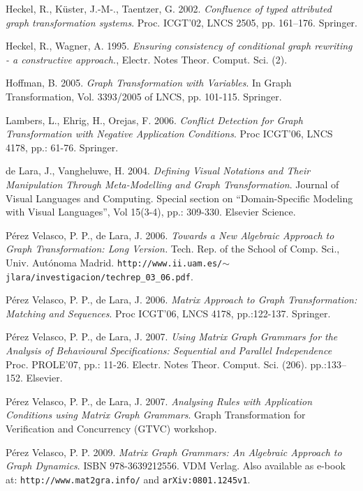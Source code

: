 \documentclass{fundam}
\begin{document}
\begin{thebibliography}{10}
 Heckel, R., K\"uster, J.-M-., Taentzer, G. 2002.
  {\em Confluence of typed attributed graph transformation systems}.
  Proc. ICGT'02, LNCS 2505, pp. 161--176. Springer.

 Heckel, R., Wagner, A. 1995.  {\em Ensuring
    consistency of conditional graph rewriting - a constructive
    approach.}, Electr. Notes Theor. Comput. Sci. (2).

 Hoffman, B. 2005.  \emph{Graph Transformation with
    Variables}.  In Graph Transformation, Vol. 3393/2005 of LNCS, pp.
  101-115. Springer.

 Lambers, L., Ehrig, H., Orejas, F. 2006.  {\em
    Conflict Detection for Graph Transformation with Negative
    Application Conditions}.  Proc ICGT'06, LNCS 4178, pp.: 61-76.
  Springer.

 de Lara, J., Vangheluwe, H. 2004.  {\em Defining Visual
    Notations and Their Manipulation Through Meta-Modelling and Graph
    Transformation}.  Journal of Visual Languages and Computing.
  Special section on ``Domain-Specific Modeling with Visual
  Languages'', Vol 15(3-4), pp.: 309-330. Elsevier Science.

 P\'erez Velasco, P. P., de Lara, J. 2006.
  \emph{Towards a New Algebraic Approach to Graph Transformation: Long
    Version.}  Tech. Rep. of the School of Comp. Sci., Univ.
  Aut\'onoma Madrid.
  {\texttt{http://www.ii.uam.es/$\sim$jlara/investigacion/techrep\_03\_06.pdf}}.

 P\'erez Velasco, P. P., de Lara, J. 2006.  {\em
    Matrix Approach to Graph Transformation: Matching and Sequences}.
  Proc ICGT'06, LNCS 4178, pp.:122-137. Springer.

 P\'erez Velasco, P. P., de Lara, J. 2007.  {\em
    Using Matrix Graph Grammars for the Analysis of Behavioural
    Specifications: Sequential and Parallel Independence} Proc.
  PROLE'07, pp.: 11-26. Electr. Notes
  Theor. Comput. Sci. (206). pp.:133--152. Elsevier.

 P\'erez Velasco, P. P., de Lara, J. 2007.  {\em
    Analysing Rules with Application Conditions using Matrix Graph
    Grammars}.  Graph Transformation for Verification and Concurrency
  (GTVC) workshop.

 P\'erez Velasco, P. P. 2009.  \emph{Matrix Graph
    Grammars: An Algebraic Approach to Graph Dynamics}.  ISBN
  978-3639212556. VDM Verlag. Also available as e-book at:
  {\texttt{http://www.mat2gra.info/}} and \texttt{arXiv:0801.1245v1}.


\end{thebibliography}
\end{document}
